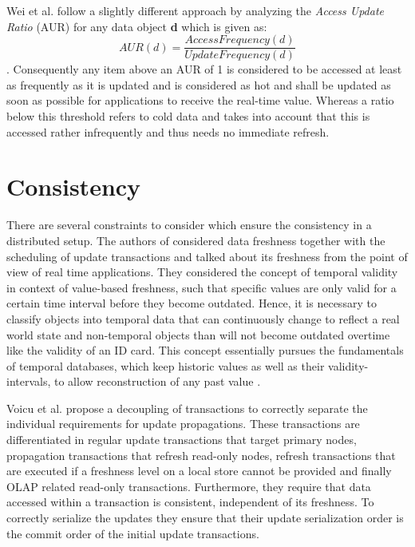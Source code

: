 Wei et al. \cite{wei:2004} follow a slightly different approach by analyzing the \emph{Access Update Ratio} (AUR) for any data object \textbf{d} which is given as: 
\begin{equation}
AUR(d) = \frac{AccessFrequency(d)}{UpdateFrequency(d)}
\end{equation}. 
Consequently any item above an AUR of 1 is considered to be accessed at least as frequently as it is updated
and is considered as hot and shall be updated as soon as possible for applications to receive the real-time value. 
Whereas a ratio below this threshold refers to cold data and takes into account that this is accessed rather infrequently and thus needs no immediate refresh. 






\section{Consistency}
\label{sec:consistency}
There are several constraints to consider which ensure the consistency in a distributed setup.
The authors of \cite{xiang:2008, wei:2004} considered data freshness together with the scheduling of update transactions and talked about its freshness from the 
point of view of real time applications. They considered the concept of temporal validity in context of value-based freshness,
such that specific values are only valid for a certain time interval before they become outdated. Hence, it is necessary to classify objects into
temporal data that can continuously change to reflect a real world state and non-temporal objects than will not become outdated overtime like the validity of an ID card.
This concept essentially pursues the fundamentals of temporal databases, which keep historic values as well as their validity-intervals, to allow reconstruction of any 
past value \cite{etzion:1998}. 

Voicu et al. \cite{voicu:2010} propose a decoupling of transactions to correctly separate the individual requirements for update propagations.
These transactions are differentiated in regular update transactions that target primary nodes, propagation transactions that refresh read-only nodes, 
refresh transactions that are executed if a freshness level on a local store cannot be provided and finally OLAP related read-only transactions.
Furthermore, they require that data accessed within a transaction is consistent, independent of its freshness. To correctly serialize the updates
they ensure that their update serialization order is the commit order of the initial update transactions.

